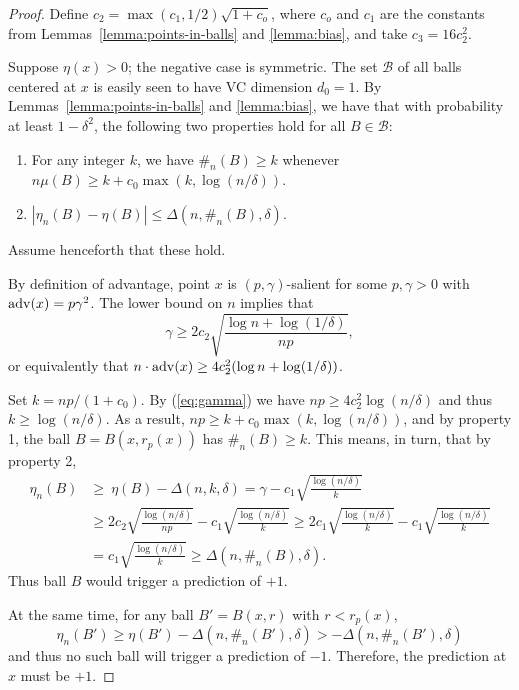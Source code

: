 \documentclass{article}
\def\B{{\mathcal B}}
\def\adv{{\rm adv}}
\begin{document}
\begin{proof}
Define $c_2 = \max(c_1, 1/2) \sqrt{1+c_o}$, where $c_o$ and $c_1$ are the constants from Lemmas~\ref{lemma:points-in-balls} and \ref{lemma:bias}, and take $c_3 = 16 c_2^2$.

Suppose $\eta(x) > 0$; the negative case is symmetric. The set $\B$ of all balls centered at $x$ is easily seen to have VC dimension $d_0 = 1$. By Lemmas~\ref{lemma:points-in-balls} and \ref{lemma:bias}, we have that with probability at least $1-\delta^2$, the following two properties hold for all $B \in \B$:
\begin{enumerate}
\item For any integer $k$, we have $\#_n(B) \geq k$ whenever $n \mu(B) \geq k + c_0 \max(k, \log (n/\delta))$.
\item $|\eta_n(B) - \eta(B)| \leq \Delta(n, \#_n(B), \delta)$.
\end{enumerate}
Assume henceforth that these hold.

By definition of advantage, point $x$ is $(p,\gamma)$-salient for some $p,\gamma> 0$ with $\adv(x) = p\gamma^2$. The lower bound on $n$ implies that
\begin{equation}
\gamma \geq 2c_2 \sqrt{\frac{\log n + \log (1/\delta)}{np}} ,
\label{eq:gamma}
\end{equation}
or equivalently that $n \cdot \adv(x) \geq 4c_2^2 (\log n + \log (1/\delta))$.

Set $k = np/(1 + c_0)$. By (\ref{eq:gamma}) we have $np \geq 4 c_2^2 \log (n/\delta)$ and thus $k \geq \log (n/\delta)$. As a result, $np \geq k + c_0 \max(k, \log (n/\delta))$, and by property 1, the ball $B = B(x, r_p(x))$ has $\#_n(B) \geq k$. This means, in turn, that by property 2,
\begin{align*}
\eta_n(B) &\geq \ \eta(B) - \Delta(n, k, \delta)
= \gamma - c_1 \sqrt{\frac{\log (n/\delta)}{k}} \\
&\geq 2c_2 \sqrt{\frac{\log (n/\delta)}{np}} - c_1 \sqrt{\frac{\log (n/\delta)}{k}}
\geq 2c_1 \sqrt{\frac{\log (n/\delta)}{k}} - c_1 \sqrt{\frac{\log (n/\delta)}{k}} \\
&= c_1 \sqrt{\frac{\log (n/\delta)}{k}} \geq \Delta(n, \#_n(B), \delta) .
\end{align*}
Thus ball $B$ would trigger a prediction of $+1$.

At the same time, for any ball $B' = B(x, r)$ with $r < r_p(x)$,
$$ \eta_n(B') \geq \eta(B') - \Delta(n, \#_n(B'), \delta) > -\Delta(n, \#_n(B'), \delta) $$
and thus no such ball will trigger a prediction of $-1$. Therefore, the prediction at $x$ must be $+1$.
\end{proof}
\end{document}
